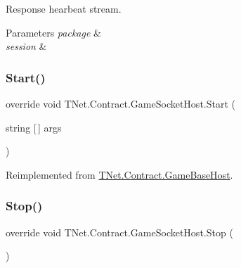 Response hearbeat stream. 


\begin{DoxyParams}{Parameters}
{\em package} & \\
\hline
{\em session} & \\
\hline
\end{DoxyParams}
\mbox{\label{class_t_net_1_1_contract_1_1_game_socket_host_a5ed0b1074c4e59abb3ff7e60eee2ceec}} 
\subsubsection{\texorpdfstring{Start()}{Start()}}
{\footnotesize\ttfamily override void T\+Net.\+Contract.\+Game\+Socket\+Host.\+Start (\begin{DoxyParamCaption}\item[{string \mbox{[}$\,$\mbox{]}}]{args }\end{DoxyParamCaption})\hspace{0.3cm}{\ttfamily [virtual]}}







Reimplemented from \mbox{\hyperlink{class_t_net_1_1_contract_1_1_game_base_host_a0bd4b389a68a6922ee0b76b4cfe9a388}{T\+Net.\+Contract.\+Game\+Base\+Host}}.

\mbox{\label{class_t_net_1_1_contract_1_1_game_socket_host_a598542dacf31acc5a7a7602ff14a0b73}} 
\subsubsection{\texorpdfstring{Stop()}{Stop()}}
{\footnotesize\ttfamily override void T\+Net.\+Contract.\+Game\+Socket\+Host.\+Stop (\begin{DoxyParamCaption}{ }\end{DoxyParamCaption})\hspace{0.3cm}{\ttfamily [virtual]}}







